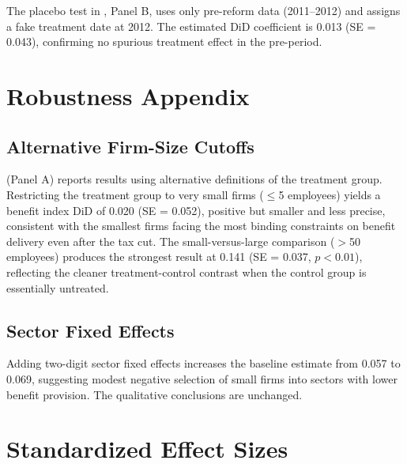\documentclass[12pt]{article}
\begin{document}
The placebo test in , Panel B, uses only pre-reform data (2011--2012) and assigns a fake treatment date at 2012. The estimated DiD coefficient is 0.013 (SE = 0.043), confirming no spurious treatment effect in the pre-period.

\section{Robustness Appendix}
\label{app:robustness}

\subsection{Alternative Firm-Size Cutoffs}

 (Panel A) reports results using alternative definitions of the treatment group. Restricting the treatment group to very small firms ($\leq$5 employees) yields a benefit index DiD of 0.020 (SE = 0.052), positive but smaller and less precise, consistent with the smallest firms facing the most binding constraints on benefit delivery even after the tax cut. The small-versus-large comparison ($>$50 employees) produces the strongest result at 0.141 (SE = 0.037, $p<0.01$), reflecting the cleaner treatment-control contrast when the control group is essentially untreated.

\subsection{Sector Fixed Effects}

Adding two-digit sector fixed effects increases the baseline estimate from 0.057 to 0.069, suggesting modest negative selection of small firms into sectors with lower benefit provision. The qualitative conclusions are unchanged.

\section{Standardized Effect Sizes}
\label{sec:sde}


\end{document}
